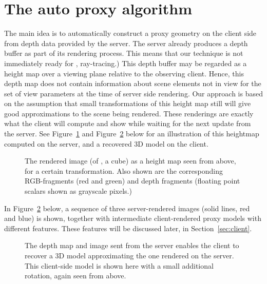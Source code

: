 
\section{The auto proxy algorithm}

The main idea is to automatically construct a proxy geometry on the client side
from depth data provided by the server. The server already produces a depth
buffer as part of its rendering process.  This means that our technique is not
immediately ready for \eg, ray-tracing.) This depth buffer may be regarded as a
height map over a viewing plane relative to the observing client. Hence, this
depth map does not contain information about scene elements not in view for the
set of view parameters at the time of server side rendering. Our approach is
based on the assumption that small transformations of this height map still will
give good approximations to the scene being rendered. These renderings are
exactly what the client will compute and show while waiting for the next update
from the server. See Figure~\ref{fig:2Dheightmap} and
Figure~\ref{fig:2DheightmapRotated} below for an illustration of this heightmap
computed on the server, and a recovered 3D model on the client.

\begin{figure}[htb]
  \centering
  
  \caption{\label{fig:2Dheightmap} The rendered image (of \eg, a cube) as a
           height map seen from above, for a certain transformation. Also shown
           are the corresponding RGB-fragments (red and green) and depth
           fragments (floating point scalars shown as grayscale pixels.)}
\end{figure}

In Figure~\ref{fig:2DheightmapRotated} below, a sequence of three server-rendered
images (solid lines, red and blue) is shown, together with intermediate
client-rendered proxy models with different features. These features will be
discussed later, in Section~\ref{sec:client}.

\begin{figure}[htb]
  \centering
  \caption{\label{fig:2DheightmapRotated}
           The depth map and image sent from the server enables the client to
           recover a 3D model approximating the one rendered on the server. This
           client-side model is shown here with a small additional rotation, again
           seen from above.}
\end{figure}

